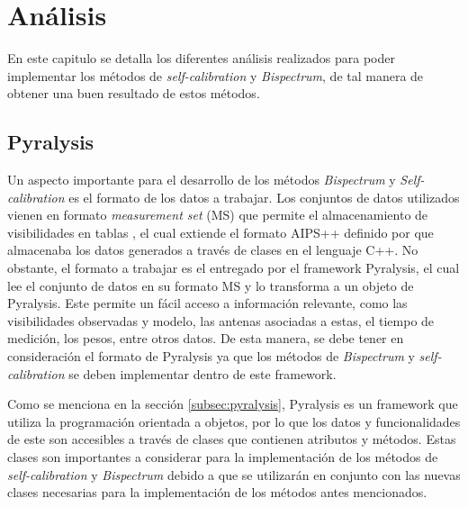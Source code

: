 \chapter{Análisis}
\label{cap:analisis}

En este capitulo se detalla los diferentes análisis realizados para poder implementar los métodos de \textit{self-calibration} y \textit{Bispectrum}, de tal manera de obtener una buen resultado de estos métodos. 

\section{Pyralysis}

Un aspecto importante para el desarrollo de los métodos \textit{Bispectrum} y \textit{Self-calibration} es el formato de los datos a trabajar. Los conjuntos de datos utilizados vienen en formato \textit{measurement set} (MS) que permite el almacenamiento de visibilidades en tablas \citep{kemball2000measurementset},  el cual extiende el formato AIPS++ definido por \cite{cornwell1997design} que almacenaba los datos generados a través de clases en el lenguaje C++. No obstante, el formato a trabajar es el entregado por el framework Pyralysis, el cual lee el conjunto de datos en su formato MS y lo transforma a un objeto de Pyralysis. Este permite un fácil acceso a información relevante, como las visibilidades observadas y modelo, las antenas asociadas a estas, el tiempo de medición, los pesos, entre otros datos. De esta manera, se debe tener en consideración el formato de Pyralysis ya que los métodos de \textit{Bispectrum} y \textit{self-calibration} se deben implementar dentro de este framework.

Como se menciona en la sección \ref{subsec:pyralysis}, Pyralysis es un framework que utiliza la programación orientada a objetos, por lo que los datos y funcionalidades de este son accesibles a través de clases que contienen atributos y métodos. Estas clases son importantes a considerar para la implementación de los métodos de \textit{self-calibration} y \textit{Bispectrum} debido a que se utilizarán en conjunto con las nuevas clases necesarias para la implementación de los métodos antes mencionados. 


